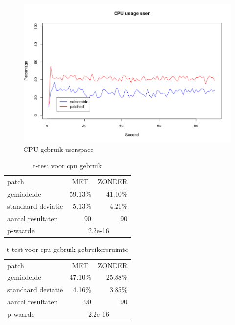 \begin{figure}
	\includegraphics[width=1.0\linewidth]{img/cpu_user.png}
	\caption{CPU gebruik userspace}
	\label{fig:cpu_user}
\end{figure}

\begin{table}[]
	\centering
	\caption{t-test voor cpu gebruik}
	\label{t_cpu}
\begin{tabular}{l|rr}
	\hline
	patch              & \multicolumn{1}{c}{MET} & \multicolumn{1}{c}{ZONDER} \\
	gemiddelde         & 59.13\%                 & 41.10\%                    \\
	standaard deviatie & 5.13\%                  & 4.21\%                     \\
	aantal resultaten  & 90                      & 90                         \\ \hline
	p-waarde           & \multicolumn{2}{c|}{2.2e-16}                        
\end{tabular}


\end{table}

\begin{table}[]
	\centering
	\caption{t-test voor cpu gebruik gebruikersruimte}
	\label{t_cpu_us}
	\begin{tabular}{l|rr}
		\hline
		patch              & \multicolumn{1}{c}{MET} & \multicolumn{1}{c}{ZONDER} \\
		gemiddelde         & 47.10\%                 & 25.88\%                    \\
		standaard deviatie & 4.16\%                  & 3.85\%                     \\
		aantal resultaten  & 90                      & 90                         \\ \hline
		p-waarde           & \multicolumn{2}{c|}{2.2e-16}                        
	\end{tabular}
\end{table}


